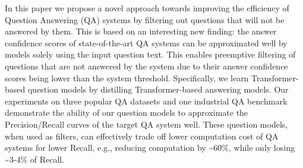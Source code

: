 In this paper we propose a novel approach towards improving the efficiency of Question Answering (QA) systems by filtering out questions that will not be answered by them. This is based on an interesting new finding: the answer confidence scores of state-of-the-art QA systems can be approximated well by models solely using the input question text. This enables preemptive filtering of questions that are not answered by the system due to their answer confidence scores being lower than the system threshold. Specifically, we learn Transformer-based question models by distilling Transformer-based answering models. Our experiments on three popular QA datasets and one industrial QA benchmark demonstrate the ability of our question models to approximate the Precision/Recall curves of the target QA system well. These question models, when used as filters, can effectively trade off lower computation cost of QA systems for lower Recall, e.g., reducing computation by {\textasciitilde}60\%, while only losing {\textasciitilde}3-4\% of Recall.
